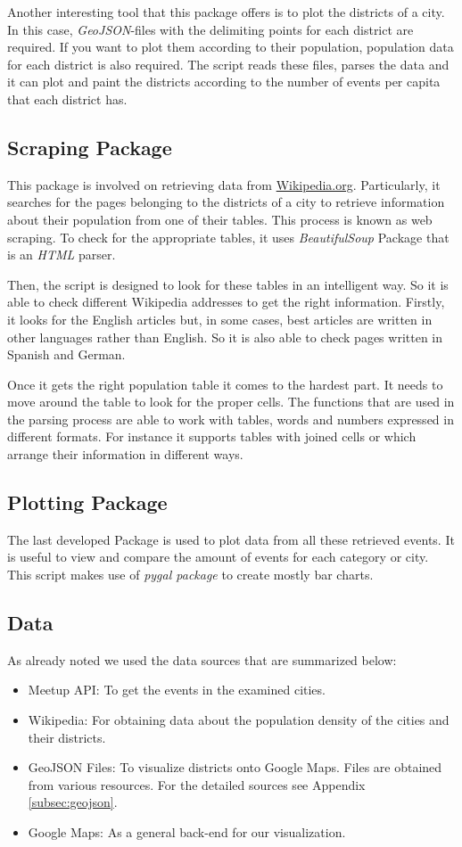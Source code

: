 Another interesting tool that this package offers is to plot the districts of a city. In this case, \emph{GeoJSON}-files with the delimiting points for each district are required. If you want to plot them according to their population, population data for each district is also required. The script reads these files, parses the data and it can plot and paint the districts according to the number of events per capita that each district has.

\subsection{Scraping Package}
This package is involved on retrieving data from \url{Wikipedia.org}. Particularly, it searches for the pages belonging to the districts of a city to retrieve information about their population from one of their tables. This process is known as web scraping. To check for the appropriate tables, it uses \textit{BeautifulSoup} Package that is an \emph{HTML} parser.

Then, the script is designed to look for these tables in an intelligent way.  So it is able to check different Wikipedia addresses to get the right information.  Firstly, it looks for the English articles but, in some cases, best articles are written in other languages rather than English. So it is also able to check pages written in Spanish and German.

Once it gets the right population table it comes to the hardest part. It needs to move around the table to look for the proper cells. The functions that are used in the parsing process are able to work with tables, words and numbers expressed in different formats. For instance it supports tables with joined cells or which arrange their information in different ways.

\subsection{Plotting Package}
The last developed Package is used to plot data from all these retrieved events. It is useful to view and compare the amount of events for each category or city. This script makes use of \textit{pygal package} \cite{pygal} to create mostly bar charts. 

\subsection{Data}

As already noted we used the data sources that are summarized below:

\begin{itemize}
\item Meetup API: To get the events in the examined cities. 
\item Wikipedia: For obtaining data about the population density of the cities and their districts. 
\item GeoJSON Files: To visualize districts onto Google Maps. Files are obtained from various resources. For the detailed sources see Appendix \ref{subsec:geojson}.
\item Google Maps: As a general back-end for our visualization.  
\end{itemize}